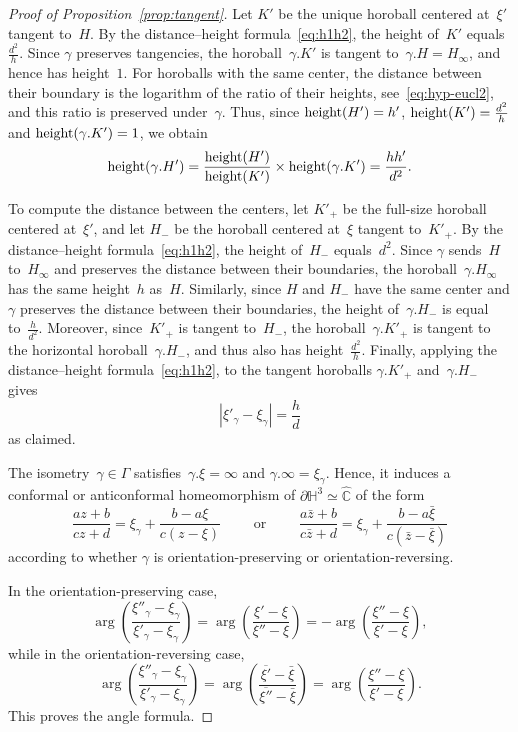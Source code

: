 \documentclass[11pt,reqno]{amsart}
\theoremstyle{definition}
\numberwithin{equation}{section}
\newcommand\C {{\mathbb C}}
\newcommand{\HH}{{\mathbb H}}
\DeclareMathOperator{\height}{{\rm height}}
\numberwithin{equation}{section}
\begin{document}
\begin{proof}[Proof of Proposition~\ref{prop:tangent}]
Let $K'$ be the unique horoball centered at~$\xi'$ tangent to~$H$.
By the distance--height formula~\eqref{eq:h1h2}, the height of~$K'$ equals~$\frac{d^2}{h}$.
Since $\gamma$ preserves tangencies, the horoball~$\gamma.K'$ is tangent to~$\gamma.H=H_\infty$, and hence has height~$1$.
For horoballs with the same center, the distance between their boundary is the logarithm of the ratio of their heights, see~\eqref{eq:hyp-eucl2}, and this ratio is preserved under~$\gamma$.
Thus, since $\height(H')=h'$, $\height(K')=\frac{d^2}{h}$ and $\height(\gamma.K')=1$, we obtain
\[
\height(\gamma.H') = \frac{\height(H')}{\height(K')} \times \height(\gamma.K') = \frac{hh'}{d^2}.
\]

To compute the distance between the centers, let $K'_+$ be the full-size horoball centered at~$\xi'$, and let $H_-$ be the horoball centered at~$\xi$ tangent to~$K'_+$.
By the distance--height formula~\eqref{eq:h1h2}, the height of~$H_-$ equals~$d^2$.
Since $\gamma$ sends~$H$ to~$H_\infty$ and preserves the distance between their boundaries, the horoball~$\gamma.H_\infty$ has the same height~$h$ as~$H$. 
Similarly, since $H$ and $H_-$ have the same center and $\gamma$ preserves the distance between their boundaries, the height of~$\gamma.H_-$ is equal to~$\frac{h}{d^2}$. 
Moreover, since~$K'_+$ is tangent to~$H_-$, the horoball~$\gamma.K'_+$ is tangent to the horizontal horoball~$\gamma.H_-$, and thus also has height~$\frac{d^2}{h}$.
Finally, applying the distance--height formula~\eqref{eq:h1h2}, to the tangent horoballs $\gamma.K'_+$ and~$\gamma.H_-$ gives
\[
|\xi'_\gamma-\xi_\gamma|=\frac{h}{d}
\]
as claimed.

The isometry~$\gamma \in \Gamma$ satisfies~$\gamma.\xi=\infty$ and $\gamma.\infty=\xi_\gamma$.
Hence, it induces a conformal or anticonformal homeomorphism of $\partial \HH^3 \simeq \widehat{\C}$ of the form
\[
\frac{az+b}{cz+d} = \xi_\gamma + \frac{b-a \xi}{c(z-\xi)}
\qquad \text{ or } \qquad
\frac{a\bar{z}+b}{c\bar{z}+d} = \xi_\gamma + \frac{b-a \bar{\xi}}{c(\bar{z}-\bar{\xi})}
\]
according to whether $\gamma$ is orientation-preserving or orientation-reversing.

In the orientation-preserving case, 
\[
\arg \left( \frac{\xi''_\gamma - \xi_\gamma}{\xi'_\gamma - \xi_\gamma} \right) = \arg  \left( \frac{\xi' - \xi}{\xi'' - \xi} \right) = - \arg  \left( \frac{\xi'' - \xi}{\xi' - \xi} \right),
\]
while in the orientation-reversing case, 
\[
\arg \left( \frac{\xi''_\gamma - \xi_\gamma}{\xi'_\gamma - \xi_\gamma} \right) = \arg  \left( \frac{\overline{\xi'} - \bar{\xi}}{\overline{\xi''} - \bar{\xi}} \right) = \arg  \left( \frac{\xi'' - \xi}{\xi' - \xi} \right).
\]
This proves the angle formula.
%
\end{proof}
\end{document}
